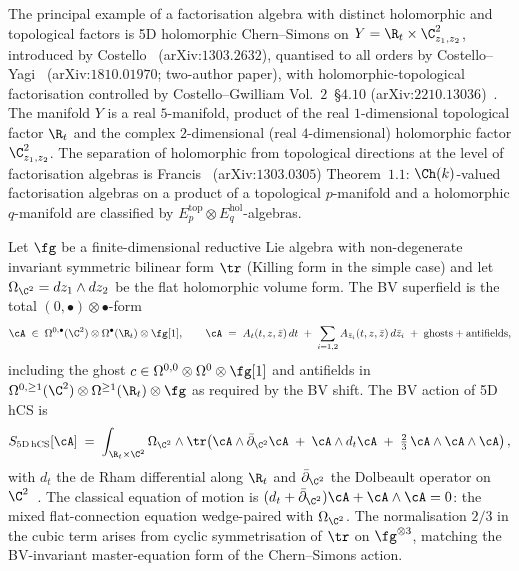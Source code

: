 The principal example of a factorisation algebra with distinct holomorphic
and topological factors is 5D holomorphic Chern--Simons on
$Y = \R_t \times \C^2_{z_1, z_2}$, introduced by
Costello~\cite{Costello2013} (arXiv:$1303.2632$), quantised to all
orders by Costello--Yagi~\cite{CostelloYagi2018}
(arXiv:$1810.01970$; two-author paper), with holomorphic-topological
factorisation controlled by Costello--Gwilliam Vol.~$2$~\S$4.10$
(arXiv:$2210.13036$)~\cite{CostelloGwilliam}. The manifold $Y$ is a
real $5$-manifold, product of the real $1$-dimensional topological
factor $\R_t$ and the complex $2$-dimensional (real $4$-dimensional)
holomorphic factor $\C^2_{z_1, z_2}$. The separation of holomorphic
from topological directions at the level of factorisation algebras is
Francis~\cite{Francis2013} (arXiv:$1303.0305$) Theorem~$1.1$:
$\Ch(k)$-valued factorisation algebras on a product of a topological
$p$-manifold and a holomorphic $q$-manifold are classified by
$E_p^{\mathrm{top}} \otimes E_q^{\mathrm{hol}}$-algebras.

Let $\fg$ be a finite-dimensional reductive Lie algebra with
non-degenerate invariant symmetric bilinear form $\tr$ (Killing form in
the simple case) and let $\Omega_{\C^2} = dz_1 \wedge dz_2$ be the
flat holomorphic volume form. The BV superfield is the total
$(0, \bullet) \otimes \bullet$-form
\begin{equation}
\label{eq:5d-hCS-field}
 \cA \;\in\; \Omega^{0, \bullet}(\C^2) \otimes \Omega^\bullet(\R_t)
 \otimes \fg[1],
 \qquad
 \cA \;=\; A_t(t, z, \bar z)\, dt
 \;+\; \sum_{i = 1, 2} A_{\bar z_i}(t, z, \bar z)\, d\bar z_i
 \;+\; \mathrm{ghosts} + \mathrm{antifields},
\end{equation}
including the ghost $c \in \Omega^{0, 0} \otimes \Omega^0 \otimes
\fg[1]$ and antifields in $\Omega^{0, \ge 1}(\C^2) \otimes
\Omega^{\ge 1}(\R_t) \otimes \fg$ as required by the BV shift. The BV
action of 5D hCS is
\begin{equation}
\label{eq:5d-hCS-action}
 S_{\mathrm{5D\,hCS}}[\cA] \;=\; \int_{\R_t \times \C^2}
 \Omega_{\C^2} \wedge \tr\!\left(
 \cA \wedge \bar\partial_{\C^2} \cA
 \;+\; \cA \wedge d_t \cA
 \;+\; \tfrac{2}{3}\, \cA \wedge \cA \wedge \cA
 \right),
\end{equation}
with $d_t$ the de Rham differential along $\R_t$ and
$\bar\partial_{\C^2}$ the Dolbeault operator on
$\C^2$~\cite{Costello2013,CostelloLi2020}. The classical equation of
motion is $(d_t + \bar\partial_{\C^2})\cA + \cA \wedge \cA = 0$: the
mixed flat-connection equation wedge-paired with $\Omega_{\C^2}$. The
normalisation $2/3$ in the cubic term arises from cyclic symmetrisation
of $\tr$ on $\fg^{\otimes 3}$, matching the BV-invariant master-equation
form of the Chern--Simons action.

